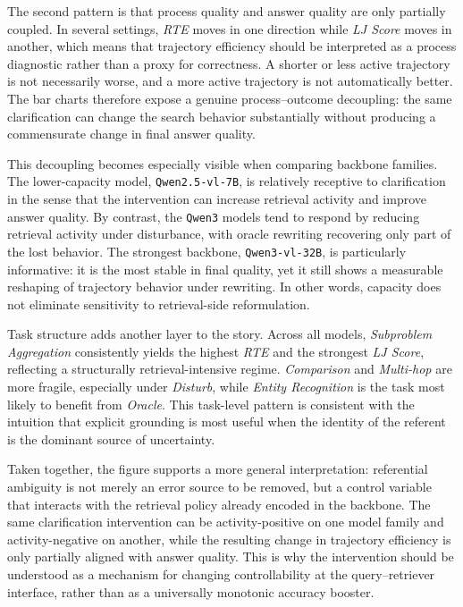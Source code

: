 The second pattern is that process quality and answer quality are only partially coupled. In several settings, \emph{RTE} moves in one direction while \emph{LJ Score} moves in another, which means that trajectory efficiency should be interpreted as a process diagnostic rather than a proxy for correctness. A shorter or less active trajectory is not necessarily worse, and a more active trajectory is not automatically better. The bar charts therefore expose a genuine process--outcome decoupling: the same clarification can change the search behavior substantially without producing a commensurate change in final answer quality.

This decoupling becomes especially visible when comparing backbone families. The lower-capacity model, \texttt{Qwen2.5-vl-7B}, is relatively receptive to clarification in the sense that the intervention can increase retrieval activity and improve answer quality. By contrast, the \texttt{Qwen3} models tend to respond by reducing retrieval activity under disturbance, with oracle rewriting recovering only part of the lost behavior. The strongest backbone, \texttt{Qwen3-vl-32B}, is particularly informative: it is the most stable in final quality, yet it still shows a measurable reshaping of trajectory behavior under rewriting. In other words, capacity does not eliminate sensitivity to retrieval-side reformulation.

Task structure adds another layer to the story. Across all models, \emph{Subproblem Aggregation} consistently yields the highest \emph{RTE} and the strongest \emph{LJ Score}, reflecting a structurally retrieval-intensive regime. \emph{Comparison} and \emph{Multi-hop} are more fragile, especially under \emph{Disturb}, while \emph{Entity Recognition} is the task most likely to benefit from \emph{Oracle}. This task-level pattern is consistent with the intuition that explicit grounding is most useful when the identity of the referent is the dominant source of uncertainty.

Taken together, the figure supports a more general interpretation: referential ambiguity is not merely an error source to be removed, but a control variable that interacts with the retrieval policy already encoded in the backbone. The same clarification intervention can be activity-positive on one model family and activity-negative on another, while the resulting change in trajectory efficiency is only partially aligned with answer quality. This is why the intervention should be understood as a mechanism for changing controllability at the query--retriever interface, rather than as a universally monotonic accuracy booster.


